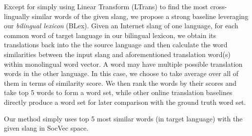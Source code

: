 Except for simply using Linear Transform (LTrans) to find the most cross-lingually similar words of the given slang, we propose a strong baseline leveraging our \textit{bilingual lexicon} (BLex). Given an Internet slang of one language, for each common word of target language in our bilingual lexicon, we obtain its translations back into the the source language and then calculate the word similarities between the input slang and aforementioned translation word(s) within monolingual word vector. 
A word may have multiple possible translation words in the other language. In this case, we choose to take average over all of them in terms of similarity score.
We then rank the words by their scores and take top 5 words to form a word set, while other online translation baselines directly produce a word set for later comparison with the ground truth word set. 

Our method simply uses top 5 most similar words (in target language) with the given slang in SocVec space.

